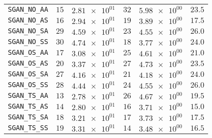\begin{xltabular}{\textwidth}{l||CC|CC||C}
	\texttt{SGAN\_NO\_AA} & $ 15$ & $ \num{2.81e+01}$ & $ 32$ & $ \num{5.98e+00}$ &$ 23.5$  \\
	\texttt{SGAN\_NO\_AS} & $ 16$ & $ \num{2.94e+01}$ & $ 19$ & $ \num{3.89e+00}$ &$ 17.5$  \\
	\texttt{SGAN\_NO\_SA} & $ 29$ & $ \num{4.59e+01}$ & $ 23$ & $ \num{4.55e+00}$ &$ 26.0$  \\
	\texttt{SGAN\_NO\_SS} & $ 30$ & $ \num{4.74e+01}$ & $ 18$ & $ \num{3.77e+00}$ &$ 24.0$  \\
	\texttt{SGAN\_OS\_AA} & $ 17$ & $ \num{3.08e+01}$ & $ 25$ & $ \num{4.61e+00}$ &$ 21.0$  \\
	\texttt{SGAN\_OS\_AS} & $ 20$ & $ \num{3.37e+01}$ & $ 27$ & $ \num{4.73e+00}$ &$ 23.5$  \\
	\texttt{SGAN\_OS\_SA} & $ 27$ & $ \num{4.16e+01}$ & $ 21$ & $ \num{4.18e+00}$ &$ 24.0$  \\
	\texttt{SGAN\_OS\_SS} & $ 28$ & $ \num{4.44e+01}$ & $ 24$ & $ \num{4.55e+00}$ &$ 26.0$  \\
	\texttt{SGAN\_TS\_AA} & $ 13$ & $ \num{2.78e+01}$ & $ 26$ & $ \num{4.67e+00}$ &$ 19.5$  \\
	\texttt{SGAN\_TS\_AS} & $ 14$ & $ \num{2.80e+01}$ & $ 16$ & $ \num{3.71e+00}$ &$ 15.0$  \\
	\texttt{SGAN\_TS\_SA} & $ 18$ & $ \num{3.21e+01}$ & $ 17$ & $ \num{3.73e+00}$ &$ 17.5$  \\
	\texttt{SGAN\_TS\_SS} & $ 19$ & $ \num{3.31e+01}$ & $ 14$ & $ \num{3.48e+00}$ &$ 16.5$  \\ \hline

\end{xltabular}
